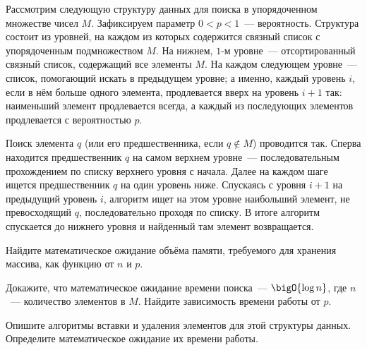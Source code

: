 Рассмотрим следующую структуру данных для поиска в упорядоченном множестве чисел $M$. Зафиксируем
параметр $0 < p < 1$~--- вероятность. Структура состоит из уровней, на каждом из которых содержится
связный список с упорядоченным подмножеством $M$. На нижнем, $1$-м уровне~--- отсортированный связный
список, содержащий все элементы $M$. На каждом следующем уровне~--- список, помогающий искать в
предыдущем уровне; а именно, каждый уровень $i$, если в нём больше одного элемента, продлевается вверх на
уровень $i + 1$ так: наименьший элемент продлевается всегда, а каждый из последующих элементов
продлевается с вероятностью $p$.

Поиск элемента $q$ (или его предшественника, если $q \notin M$) проводится так. Сперва находится
предшественник $q$ на самом верхнем уровне~--- последовательным прохождением по списку верхнего уровня с
начала. Далее на каждом шаге ищется предшественник $q$ на один уровень ниже. Спускаясь с уровня $i + 1$
на предыдущий уровень $i$, алгоритм ищет на этом уровне наибольший элемент, не превосходящий $q$,
последовательно проходя по списку. В итоге алгоритм спускается до нижнего уровня и найденный там элемент
возвращается.

\begin{enumcyr}
    \item Найдите математическое ожидание объёма памяти, требуемого для хранения массива, как функцию от
        $n$ и $p$.
    \item Докажите, что математическое ожидание времени поиска~--- $\bigO{\log n}$, где $n$~---
        количество элементов в $M$. Найдите зависимость времени работы от $p$.
    \item Опишите алгоритмы вставки и удаления элементов для этой структуры данных. Определите
        математическое ожидание их времени работы.
\end{enumcyr}

